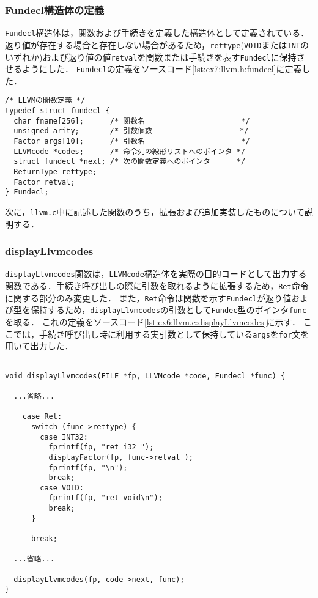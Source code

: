 \documentclass[uplatex]{jsarticle}
\begin{document}
\subsubsection{Fundecl構造体の定義}
\verb#Fundecl#構造体は，関数および手続きを定義した構造体として定義されている．
返り値が存在する場合と存在しない場合があるため，\verb#rettype#(\verb#VOID#または\verb#INT#のいずれか)および返り値の値\verb#retval#を関数または手続きを表す\verb#Fundecl#に保持させるようにした．
\verb#Fundecl#の定義をソースコード\ref{lst:ex7:llvm.h:fundecl}に定義した．
\begin{lstlisting}[caption=Fundecl構造体,label=lst:ex7:llvm.h:fundecl]
/* LLVMの関数定義 */
typedef struct fundecl {
  char fname[256];      /* 関数名                      */
  unsigned arity;       /* 引数個数                    */
  Factor args[10];      /* 引数名                      */
  LLVMcode *codes;      /* 命令列の線形リストへのポインタ */
  struct fundecl *next; /* 次の関数定義へのポインタ      */
  ReturnType rettype;
  Factor retval;
} Fundecl;
\end{lstlisting}

次に，\verb#llvm.c#中に記述した関数のうち，拡張および追加実装したものについて説明する．

\subsubsection{displayLlvmcodes}
\verb#displayLlvmcodes#関数は，\verb#LLVMcode#構造体を実際の目的コードとして出力する関数である．手続き呼び出しの際に引数を取れるように拡張するため，\verb#Ret#命令に関する部分のみ変更した．
また，\verb#Ret#命令は関数を示す\verb#Fundecl#が返り値および型を保持するため，\verb#displayLlvmcodes#の引数として\verb#Fundec#型のポインタ\verb#func#を取る．
これの定義をソースコード\ref{lst:ex6:llvm.c:displayLlvmcodes}に示す．
ここでは，手続き呼び出し時に利用する実引数として保持している\verb#args#を\verb#for#文を用いて出力した．
\begin{lstlisting}[caption=displayLlvmcodes関数,label=lst:ex6:llvm.c:displayLlvmcodes]

void displayLlvmcodes(FILE *fp, LLVMcode *code, Fundecl *func) {

  ...省略...

    case Ret:
      switch (func->rettype) {
        case INT32:
          fprintf(fp, "ret i32 ");
          displayFactor(fp, func->retval );
          fprintf(fp, "\n");
          break;
        case VOID:
          fprintf(fp, "ret void\n");
          break;
      }

      break;

  ...省略...

  displayLlvmcodes(fp, code->next, func);
}
\end{lstlisting}
\end{document}
